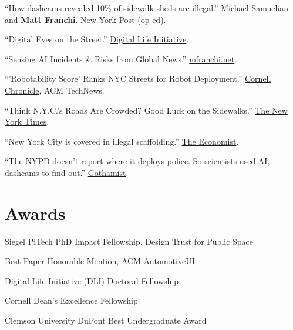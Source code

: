 \documentclass[10pt,letterpaper]{report}
\begin{document}
    \begin{tablist}
        \item[2026] \tab{}``How dashcams revealed 10\% of sidewalk sheds are illegal.'' Michael Samuelian and \textbf{Matt Franchi}. \href{https://nypost.com/2026/02/13/opinion/how-to-shed-those-ugly-sheds-and-see-paradise-by-the-dashboard-camera/}{New York Post} (op-ed).
        \item[2025] \tab{}``Digital Eyes on the Street.'' \href{https://dli.tech.cornell.edu/post/digital-eyes-on-the-street}{Digital Life Initiative}.
        \item[2025] \tab{}``Sensing AI Incidents \& Risks from Global News.'' \href{https://mfranchi.net/posts/uair-brief/}{mfranchi.net}.
        \item[2025] \tab{}``'Robotability Score' Ranks NYC Streets for Robot Deployment.'' \href{https://news.cornell.edu/stories/2025/04/robotability-score-ranks-nyc-streets-future-robot-deployment}{Cornell Chronicle}, ACM TechNews.
        \item[2024] \tab{}``Think N.Y.C.'s Roads Are Crowded? Good Luck on the Sidewalks.'' \href{https://www.nytimes.com/2024/07/29/nyregion/street-wars-crowded-sidewalks-times-square.html}{The New York Times}.
        \item[2024] \tab{}``New York City is covered in illegal scaffolding.'' \href{https://www.economist.com/science-and-technology/2024/03/13/new-york-city-is-covered-in-illegal-scaffolding}{The Economist}.
        \item[2023] \tab{}``The NYPD doesn't report where it deploys police. So scientists used AI, dashcams to find out.'' \href{https://gothamist.com/news/nypd-does-not-report-where-it-deploys-police-scientists-used-ai-dashcams-to-find-out}{Gothamist}.
    \end{tablist}

    \section*{Awards}

    \begin{tablist}
        \item[2025] \tab{}Siegel PiTech PhD Impact Fellowship, Design Trust for Public Space
        \item[2024] \tab{}Best Paper Honorable Mention, ACM AutomotiveUI
        \item[2024] \tab{}Digital Life Initiative (DLI) Doctoral Fellowship
        \item[2022] \tab{}Cornell Dean's Excellence Fellowship
        \item[2021] \tab{}Clemson University DuPont Best Undergraduate Award
    \end{tablist}
\end{document}

